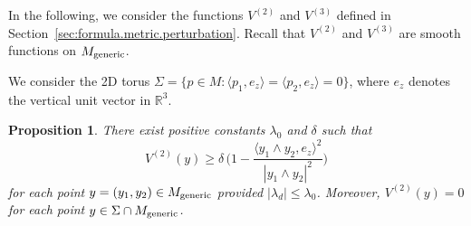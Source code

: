\documentclass[11pt]{amsart}
\newtheorem{proposition}[theorem]{Proposition}
\theoremstyle{definition}
\begin{document}

In the following, we consider the functions $V^{(2)}$ and $V^{(3)}$ defined in Section~\ref{sec:formula.metric.perturbation}. Recall that $V^{(2)}$ and $V^{(3)}$ are smooth functions on $M_{\text{\rm generic}}$. 

We consider the 2D torus $\Sigma = \{p \in M: \langle p_1,e_z \rangle = \langle p_2,e_z\rangle = 0\}$, where $e_z$ denotes the vertical unit vector in $\mathbb{R}^3$.

\begin{proposition}
\label{second.order.change.in.sectional.curvature}
There exist positive constants $\lambda_0$ and $\delta$ such that
\[V^{(2)}(y) \geq \delta \, \Big ( 1 - \frac{\langle y_1 \wedge y_2,e_z \rangle^2}{|y_1 \wedge y_2|^2} \Big )\] 
for each point $y = (y_1,y_2) \in M_{\text{\rm generic}}$ provided $|\lambda_d|\leq \lambda_0$. Moreover, $V^{(2)}(y) = 0$ for each point $y \in \Sigma \cap M_{\text{\rm generic}}$. 
\end{proposition}
\end{document}
